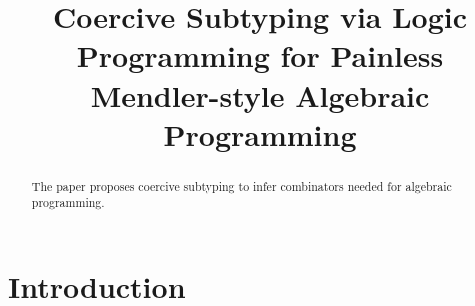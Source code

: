 \documentclass[runningheads]{llncs}
\begin{document}
\title{Coercive Subtyping via Logic Programming for Painless Mendler-style Algebraic Programming}






\maketitle

\begin{abstract}
  The paper proposes coercive subtyping to infer combinators needed
  for algebraic programming.  

\end{abstract}



\section{Introduction} %

\end{document}
